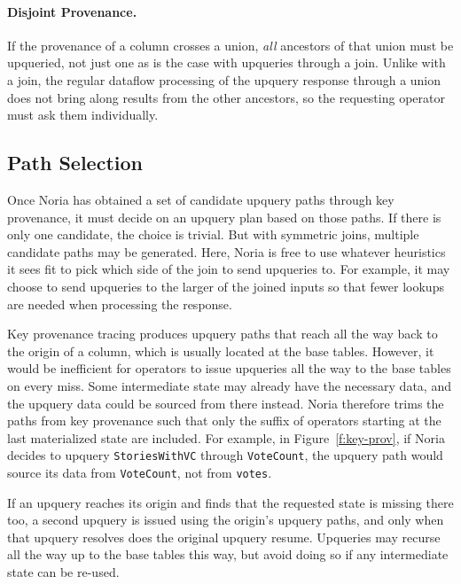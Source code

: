 \paragraph{Disjoint Provenance.}
If the provenance of a column crosses a union, \emph{all} ancestors of that
union must be upqueried, not just one as is the case with upqueries through a
join. Unlike with a join, the regular dataflow processing of the upquery
response through a union does not bring along results from the other ancestors,
so the requesting operator must ask them individually.

\subsection{Path Selection}
\label{s:upquery:selection}

Once Noria has obtained a set of candidate upquery paths through key provenance,
it must decide on an upquery plan based on those paths. If there is only one
candidate, the choice is trivial. But with symmetric joins, multiple candidate
paths may be generated. Here, Noria is free to use whatever heuristics it sees
fit to pick which side of the join to send upqueries to. For example, it may
choose to send upqueries to the larger of the joined inputs so that fewer
lookups are needed when processing the response.

Key provenance tracing produces upquery paths that reach all the way back to the
origin of a column, which is usually located at the base tables. However, it
would be inefficient for operators to issue upqueries all the way to the base
tables on every miss. Some intermediate state may already have the necessary
data, and the upquery data could be sourced from there instead. Noria therefore
trims the paths from key provenance such that only the suffix of operators
starting at the last materialized state are included. For example, in
Figure~\ref{f:key-prov}, if Noria decides to upquery \texttt{StoriesWithVC}
through \texttt{VoteCount}, the upquery path would source its data from
\texttt{VoteCount}, not from \texttt{votes}.

If an upquery reaches its origin and finds that the requested state is missing
there too, a second upquery is issued using the origin's upquery paths, and only
when that upquery resolves does the original upquery resume. Upqueries may
recurse all the way up to the base tables this way, but avoid doing so if any
intermediate state can be re-used.

